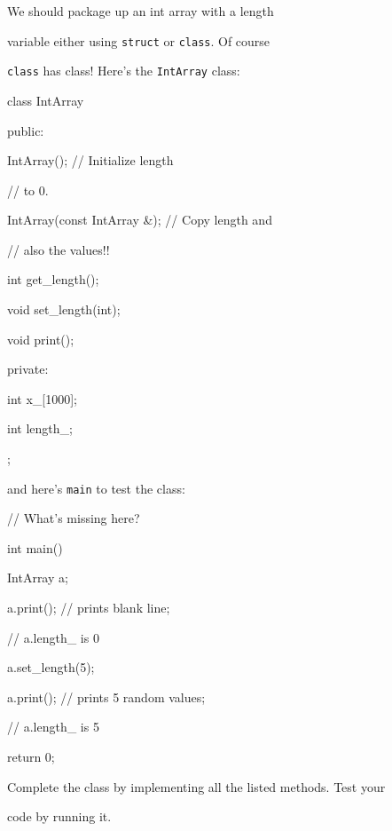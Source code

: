 We should package up an int array with a length

variable either using \texttt{struct} or \texttt{class}. Of course

\texttt{class} has class! Here's the \texttt{IntArray} class:



\begin{consolethree}[escapeinside=||]

class IntArray

{

public:

    IntArray();                   // Initialize length

                                  // to 0.

    IntArray(const IntArray &);   // Copy length and

                                  // also the values!!

    int get_length();

    void set_length(int);

    void print();

private:

    int x_[1000];

    int length_;

};

\end{consolethree}



and here's \texttt{main} to test the class:



\begin{consolethree}[escapeinside=||]

// What's missing here?



int main()

{

    IntArray a;

    a.print();          // prints blank line;

                        // a.length_ is 0

    a.set_length(5);

    a.print();          // prints 5 random values;

                        // a.length_ is 5

    return 0;

}

\end{consolethree}



Complete the class by implementing all the listed methods. Test your

code by running it.

